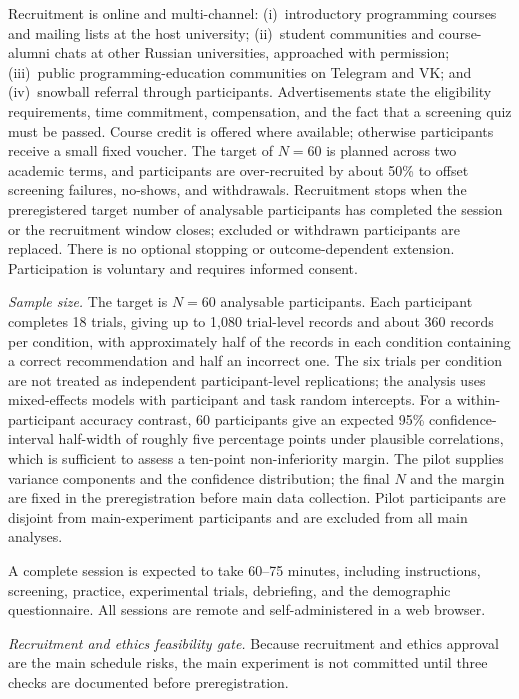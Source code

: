 \documentclass[oneside,final,14pt,a4paper]{extreport}
\begin{document}
Recruitment is online and multi-channel: (i)~introductory programming courses
and mailing lists at the host university; (ii)~student communities and
course-alumni chats at other Russian universities, approached with permission;
(iii)~public programming-education communities on Telegram and VK; and
(iv)~snowball referral through participants. Advertisements state the
eligibility requirements, time commitment, compensation, and the fact that a
screening quiz must be passed. Course credit is offered where available;
otherwise participants receive a small fixed voucher. The target of $N=60$ is
planned across two academic terms, and participants are over-recruited by about
50\% to offset screening failures, no-shows, and withdrawals. Recruitment stops
when the preregistered target number of analysable participants has completed
the session or the recruitment window closes; excluded or withdrawn participants
are replaced. There is no optional stopping or outcome-dependent extension.
Participation is voluntary and requires informed consent.

\emph{Sample size.} The target is $N=60$ analysable participants. Each
participant completes 18 trials, giving up to 1,080 trial-level records and
about 360 records per condition, with approximately half of the records in each
condition containing a correct recommendation and half an incorrect one. The
six trials per condition are not treated as independent participant-level
replications; the analysis uses mixed-effects models with participant and task
random intercepts. For a within-participant accuracy contrast, 60 participants
give an expected 95\% confidence-interval half-width of roughly five percentage
points under plausible correlations, which is sufficient to assess a ten-point
non-inferiority margin. The pilot supplies variance components and the
confidence distribution; the final $N$ and the margin are fixed in the
preregistration before main data collection. Pilot participants are disjoint
from main-experiment participants and are excluded from all main analyses.

A complete session is expected to take 60--75 minutes, including instructions,
screening, practice, experimental trials, debriefing, and the demographic
questionnaire. All sessions are remote and self-administered in a web browser.

\emph{Recruitment and ethics feasibility gate.} Because recruitment and ethics
approval are the main schedule risks, the main experiment is not committed until
three checks are documented before preregistration.
\end{document}
